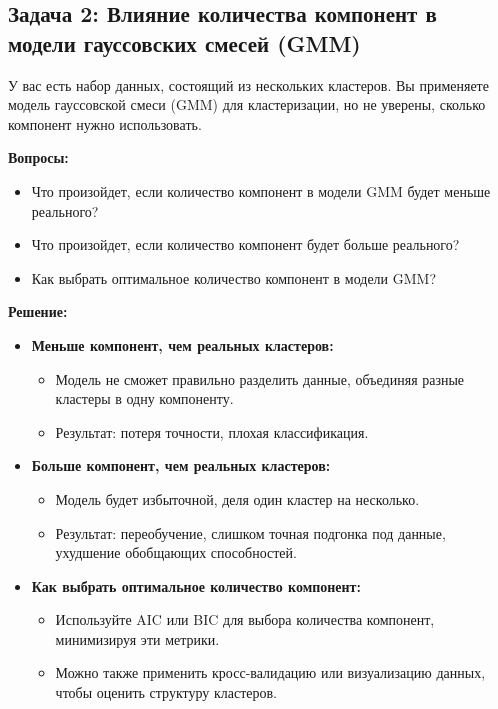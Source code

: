 \subsection{Задача 2: Влияние количества компонент в модели гауссовских смесей (GMM)}

У вас есть набор данных, состоящий из нескольких кластеров. Вы применяете модель гауссовской смеси (GMM) для кластеризации, но не уверены, сколько компонент нужно использовать.

\noindent\textbf{Вопросы:}
\begin{itemize}
    \item Что произойдет, если количество компонент в модели GMM будет меньше реального?
    \item Что произойдет, если количество компонент будет больше реального?
    \item Как выбрать оптимальное количество компонент в модели GMM?
\end{itemize}

\noindent\textbf{Решение:}
\begin{itemize}
    \item \textbf{Меньше компонент, чем реальных кластеров:}
    \begin{itemize}
        \item Модель не сможет правильно разделить данные, объединяя разные кластеры в одну компоненту.
        \item Результат: потеря точности, плохая классификация.
    \end{itemize}

    \item \textbf{Больше компонент, чем реальных кластеров:}
    \begin{itemize}
        \item Модель будет избыточной, деля один кластер на несколько.
        \item Результат: переобучение, слишком точная подгонка под данные, ухудшение обобщающих способностей.
    \end{itemize}

    \item \textbf{Как выбрать оптимальное количество компонент:}
    \begin{itemize}
        \item Используйте AIC или BIC для выбора количества компонент, минимизируя эти метрики.
        \item Можно также применить кросс-валидацию или визуализацию данных, чтобы оценить структуру кластеров.
    \end{itemize}
\end{itemize}

